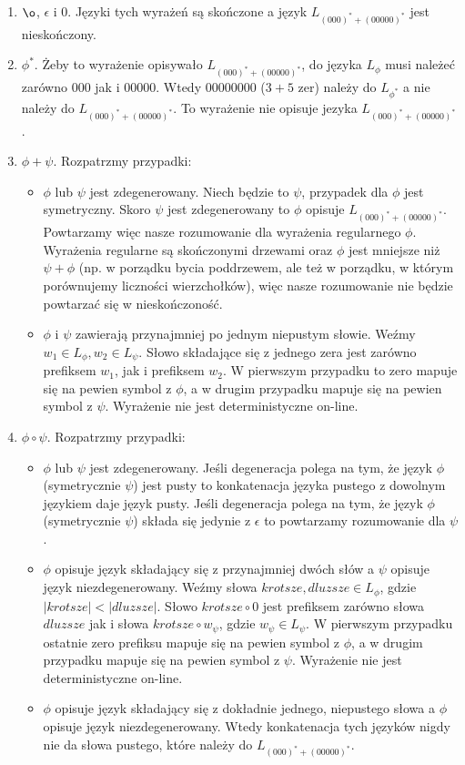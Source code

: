 \documentclass[a4paper]{article}
\begin{document}
\begin{enumerate}
\item $\o$, $\epsilon$ i $0$. Języki tych wyrażeń są skończone a język $L_{(000)^* + (00000)^*}$ jest nieskończony.
\item $\phi^*$. Żeby to wyrażenie opisywało $L_{(000)^* + (00000)^*}$, do języka $L_{\phi}$ musi należeć zarówno $000$ jak i $00000$. Wtedy $00000000$ ($3+5$ zer) należy do $L_{\phi^*}$ a nie należy do $L_{(000)^* + (00000)^*}$. To wyrażenie nie opisuje jezyka $L_{(000)^* + (00000)^*}$.
\item $\phi + \psi$. Rozpatrzmy przypadki:
  \begin{itemize}
    \item $\phi$ lub $\psi$ jest zdegenerowany. Niech będzie to $\psi$, przypadek dla $\phi$ jest symetryczny. Skoro $\psi$ jest zdegenerowany to $\phi$ opisuje $L_{(000)^* + (00000)^*}$. Powtarzamy więc nasze rozumowanie dla wyrażenia regularnego $\phi$. Wyrażenia regularne są skończonymi drzewami oraz $\phi$ jest mniejsze niż $\psi + \phi$ (np. w porządku bycia poddrzewem, ale też w porządku, w którym porównujemy liczności wierzchołków), więc nasze rozumowanie nie będzie powtarzać się w nieskończoność.
    \item $\phi$ i $\psi$ zawierają przynajmniej po jednym niepustym słowie. Weźmy $w_1 \in L_{\phi}, w_2 \in L_{\psi}$. Słowo składające się z jednego zera jest zarówno prefiksem $w_1$, jak i prefiksem $w_2$. W pierwszym przypadku to zero mapuje się na pewien symbol z $\phi$, a w drugim przypadku mapuje się na pewien symbol z $\psi$. Wyrażenie nie jest deterministyczne on-line.
  \end{itemize}
\item $\phi \circ \psi$. Rozpatrzmy przypadki:
  \begin{itemize}
  \item $\phi$ lub $\psi$ jest zdegenerowany. Jeśli degeneracja polega na tym, że język $\phi$ (symetrycznie $\psi$) jest pusty to konkatenacja języka pustego z dowolnym językiem daje język pusty. Jeśli degeneracja polega na tym, że język $\phi$ (symetrycznie $\psi$) składa się jedynie z $\epsilon$ to powtarzamy rozumowanie dla $\psi$.
    \item $\phi$ opisuje język składający się z przynajmniej dwóch słów a $\psi$ opisuje język niezdegenerowany. Weźmy słowa $krotsze, dluzsze \in L_{\phi}$, gdzie $|krotsze| < |dluzsze|$. Słowo $krotsze \circ 0$ jest prefiksem zarówno słowa $dluzsze$ jak i słowa $krotsze \circ w_{\psi}$, gdzie $w_{\psi} \in L_{\psi}$. W pierwszym przypadku ostatnie zero prefiksu mapuje się na pewien symbol z $\phi$, a w drugim przypadku mapuje się na pewien symbol z $\psi$. Wyrażenie nie jest deterministyczne on-line.
    \item $\phi$ opisuje język składający się z dokładnie jednego, niepustego słowa a $\phi$ opisuje język niezdegenerowany. Wtedy konkatenacja tych języków nigdy nie da słowa pustego, które należy do $L_{(000)^* + (00000)^*}$.
  \end{itemize}
\end{enumerate}
\end{document}
